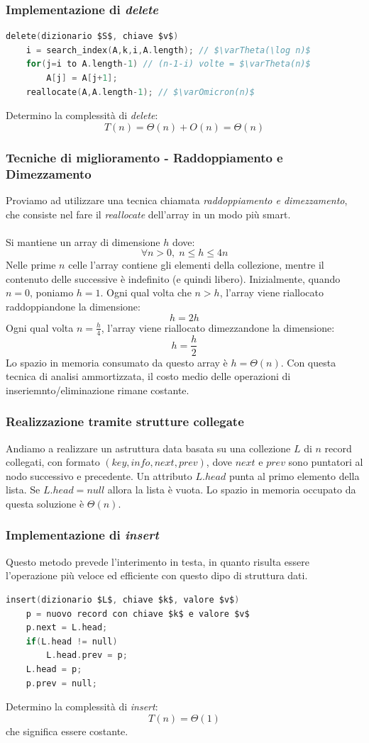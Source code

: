 \documentclass[italian]{article}
\newcommand{\varOmicron}{O}
\begin{document}
\subsubsection{Implementazione di \textit{delete}}
\begin{lstlisting}[language=c,mathescape=true]
delete(dizionario $S$, chiave $v$)
	i = search_index(A,k,i,A.length); // $\varTheta(\log n)$
	for(j=i to A.length-1) // (n-1-i) volte = $\varTheta(n)$
		A[j] = A[j+1];
	reallocate(A,A.length-1); // $\varOmicron(n)$
\end{lstlisting}
Determino la complessità di \textit{delete}:
\[
	T(n) = \varTheta(n) + \varOmicron(n) = \varTheta(n)
\]
\subsubsection{Tecniche di miglioramento - Raddoppiamento e Dimezzamento}
Proviamo ad utilizzare una tecnica chiamata \textit{raddoppiamento e dimezzamento}, che consiste nel fare il \textit{reallocate} dell'array in un modo più smart.\\\\
Si mantiene un array di dimensione $h$ dove:
\[
	\forall n > 0,\; n \leq h \leq 4n
\]
Nelle prime $n$ celle l'array contiene gli elementi della collezione, mentre il contenuto delle successive è indefinito (e quindi libero). Inizialmente, quando $n = 0$, poniamo $h=1$. Ogni qual volta che $n>h$, l'array viene riallocato raddoppiandone la dimensione:
\[
	h = 2h
\]
Ogni qual volta $n = \frac{h}{4}$, l'array viene riallocato dimezzandone la dimensione:
\[
	h = \frac{h}{2}
\]
Lo spazio in memoria consumato da questo array è $h = \varTheta(n)$. Con questa tecnica di analisi ammortizzata, il costo medio delle operazioni di inseriemnto/eliminazione rimane costante.
\pagebreak
\subsubsection{Realizzazione tramite strutture collegate}
Andiamo a realizzare un astruttura data basata su una collezione $L$ di $n$ record collegati, con formato $(key,info,next,prev)$, dove $next$ e $prev$ sono puntatori al nodo successivo e precedente. Un attributo $L.head$ punta al primo elemento della lista. Se $L.head = null$ allora la lista è vuota. Lo spazio in memoria occupato da questa soluzione è $\varTheta(n)$.
\subsubsection{Implementazione di \textit{insert}}
Questo metodo prevede l'interimento in testa, in quanto risulta essere l'operazione più veloce ed efficiente con questo dipo di struttura dati.
\begin{lstlisting}[language=c,mathescape=true]
insert(dizionario $L$, chiave $k$, valore $v$)
	p = nuovo record con chiave $k$ e valore $v$
	p.next = L.head;
	if(L.head != null)
		L.head.prev = p;
	L.head = p;
	p.prev = null;
\end{lstlisting}
Determino la complessità di \textit{insert}:
\[
	T(n) = \varTheta(1)
\]
che significa essere costante.
\end{document}

